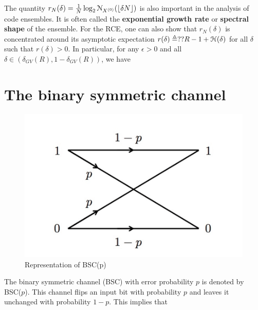 \documentclass[letterpaper,english,10pt]{article}
\begin{document}
The quantity $r_N(\delta) = \frac{1}{N}\log_2\mathcal{N}_{X^{(0)}}(\lfloor\delta N\rfloor)$ is also important in the analysis of code ensembles. 
It is often called the \textbf{exponential growth rate} or \textbf{spectral shape} of the ensemble. 
For the RCE, one can also show that $r_N(\delta)$ is concentrated around its asymptotic expectation $r(\delta) \triangleq ?? R-1+\mathcal{H}(\delta)$ for all $\delta$ such that $r(\delta) > 0$. 
In particular, for any $\epsilon > 0$ and all $\delta \in (\delta_{GV}(R), 1 - \delta_{GV}(R))$, we have
\section{The binary symmetric channel}
\begin{figure}[h!]
    \centering
    \includegraphics[scale=0.4]{Figures/bscp.png}
    \caption{Representation of BSC(p)}
    \label{fig:my_label}
\end{figure}
\flushleft The binary symmetric channel (BSC) with error probability $p$ is denoted by BSC($p$). 
This channel flips an input bit with probability $p$ and leaves it unchanged with probability $1 - p$. 
This implies that 
\end{document}
